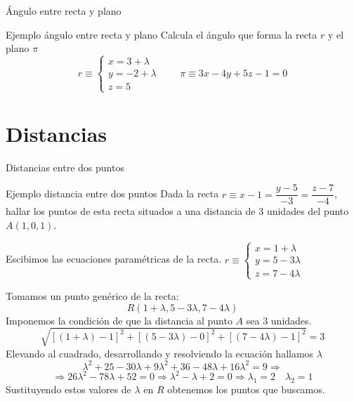 \documentclass[8pt]{beamer}
\renewcommand{\vector}[1]{\overrightarrow{#1}}
\newcommand{\g}{{}^\circ}
\newcommand{\arcsen}{\mathop{\rm arcsen}\nolimits}
\begin{document}
\begin{frame}{Ángulo entre recta y plano}
\begin{exampleblock}{Ejemplo ángulo entre recta y plano}
Calcula el ángulo que forma la recta $r$ y el plano $\pi$
\[ r \equiv \begin{cases} x= 3+\lambda \\ y = -2+\lambda \\ z= 5 \end{cases} \qquad \pi \equiv 3x-4y+5z-1=0 \] 
\end{exampleblock}
\onslide*<3->{
\[ \vector{v}=(1,1,0) \qquad \vector{n}=(3,-4,5) \]
}
\onslide*<5->{
\[ \alpha = \arcsen \left( \dfrac{|1\cdot 3 +1 \cdot (-4) +0 \cdot 5|}{\sqrt{1^2+1^2+0^2}\sqrt{3^2+(-4)^2+5^2}} \right)= \arcsen \left(\dfrac{1}{\sqrt{2}\sqrt{50}}\right) \Rightarrow \]
}
\onslide*<6->{ \resultado{ $\alpha =  5,74\g$}}

\end{frame}

\section{Distancias}

\begin{frame}{Distancias entre dos puntos}
\begin{exampleblock}{Ejemplo distancia entre dos puntos}
Dada la recta $r \equiv x-1=\dfrac{y-5}{-3}=\dfrac{z-7}{-4}$, hallar los puntos de esta recta situados a una distancia de 3 unidades del punto $A(1,0,1)$.
\end{exampleblock}
\pause

Escibimos las ecuaciones paramétricas de la recta.
\pause
$r \equiv \begin{cases} x=1+\lambda \\ y = 5-3\lambda \\ z= 7-4\lambda \end{cases}$
\pause

Tomamos un punto genérico de la recta:
\pause
\[ R (1+\lambda, 5-3\lambda, 7-4\lambda) \]
\pause
Imponemos la condición de que la distancia al punto $A$ sea 3 unidades.
\pause
\[ \sqrt{[(1+\lambda)-1]^2+[( 5-3\lambda)-0]^2+[(7-4\lambda)-1]^2}=3 \]
\pause
Elevando al cuadrado, desarrollando y resolviendo la ecuación hallamos $\lambda$
\pause
\[ \lambda^2+25-30\lambda+9\lambda^2+36-48\lambda+16\lambda^2=9 \Rightarrow \]
\[ \Rightarrow 26\lambda^2-78\lambda+52=0 \Rightarrow \lambda^2-\lambda+2=0 \Rightarrow \lambda_1 = 2 \quad \lambda_2= 1 \]
\pause
Sustituyendo estos valores de $\lambda$ en $R$ obtenemos los puntos que buscamos. 
\end{frame}
\end{document}
